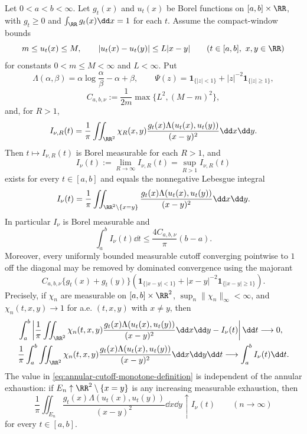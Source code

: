 \begin{lemma}%
\label{lem:annular-cutoff-measurable-bregman-dissipation}
Let \(0<a<b<\infty\).  Let \(g_t(x)\) and \(u_t(x)\) be Borel functions on
\([a,b]\times\RR\), with \(g_t\ge0\) and
\(\int_{\RR}g_t(x)\dd x=1\) for each \(t\).  Assume the compact-window bounds
\[
m\le u_t(x)\le M,\qquad |u_t(x)-u_t(y)|\le L|x-y|
\qquad(t\in[a,b],\ x,y\in\RR)
\]
for constants \(0<m\le M<\infty\) and \(L<\infty\).  Put
\[
\Lambda(\alpha,\beta)=\alpha\log\frac{\alpha}{\beta}-\alpha+\beta,\qquad
\Psi(z)=\mathbf1_{\{|z|<1\}}+|z|^{-2}\mathbf1_{\{|z|\ge1\}},
\]
\[
C_{a,b,\nu}:=\frac{1}{2m}\max\{L^2,(M-m)^2\},
\]
and, for \(R>1\),
\[
I_{\nu,R}(t)=\frac1\pi\iint_{\RR^2}\chi_R(x,y)
\frac{g_t(x)\Lambda(u_t(x),u_t(y))}{(x-y)^2}\dd x\dd y .
\]
Then \(t\mapsto I_{\nu,R}(t)\) is Borel measurable for each \(R>1\), and
\begin{equation}\label{eq:annular-cutoff-monotone-definition}
I_\nu(t):=\lim_{R\to\infty}I_{\nu,R}(t)
=\sup_{R>1}I_{\nu,R}(t)
\end{equation}
exists for every \(t\in[a,b]\) and equals the nonnegative Lebesgue integral
\begin{equation}\label{eq:annular-cutoff-full-integral}
I_\nu(t)=\frac1\pi\iint_{\RR^2\setminus\{x=y\}}
\frac{g_t(x)\Lambda(u_t(x),u_t(y))}{(x-y)^2}\dd x\dd y .
\end{equation}
In particular \(I_\nu\) is Borel measurable and
\begin{equation}\label{eq:annular-cutoff-compact-window-bound}
\int_a^b I_\nu(t)\dd t\le \frac{4C_{a,b,\nu}}{\pi}(b-a).
\end{equation}
Moreover, every uniformly bounded measurable cutoff converging pointwise to
\(1\) off the diagonal may be removed by dominated convergence using the
majorant
\begin{equation}\label{eq:annular-cutoff-reusable-majorant}
C_{a,b,\nu}\{g_t(x)+g_t(y)\}
\left(\mathbf1_{\{|x-y|<1\}}+|x-y|^{-2}\mathbf1_{\{|x-y|\ge1\}}\right).
\end{equation}
Precisely, if \(\chi_n\) are measurable on \([a,b]\times\RR^2\),
\(\sup_n\|\chi_n\|_\infty<\infty\), and
\(\chi_n(t,x,y)\to1\) for a.e. \((t,x,y)\) with \(x\ne y\), then
\begin{align}
&\int_a^b\left|
\frac1\pi\iint_{\RR^2}\chi_n(t,x,y)
\frac{g_t(x)\Lambda(u_t(x),u_t(y))}{(x-y)^2}\dd x\dd y
-I_\nu(t)\right|\dd t \longrightarrow0, \label{eq:bregman-cutoff-l1-time-removal}\\
&\frac1\pi\int_a^b\iint_{\RR^2}\chi_n(t,x,y)
\frac{g_t(x)\Lambda(u_t(x),u_t(y))}{(x-y)^2}\dd x\dd y\dd t
\longrightarrow
\int_a^b I_\nu(t)\dd t . \label{eq:bregman-cutoff-integral-removal}
\end{align}
The value in \eqref{eq:annular-cutoff-monotone-definition} is independent of
the annular exhaustion: if \(E_n\uparrow\RR^2\setminus\{x=y\}\) is any
increasing measurable exhaustion, then
\[
\frac1\pi\iint_{E_n}
\frac{g_t(x)\Lambda(u_t(x),u_t(y))}{(x-y)^2}\dd x\dd y
\uparrow I_\nu(t)
\qquad(n\to\infty)
\]
for every \(t\in[a,b]\).


\end{lemma}
